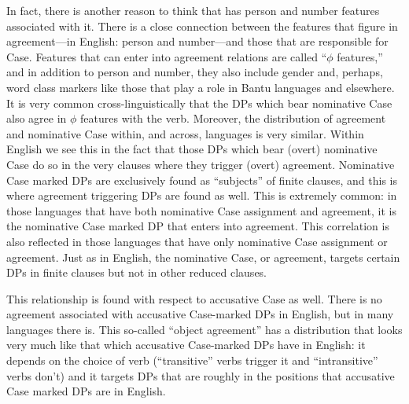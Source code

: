 In fact, there is another reason to think that  has person and number features associated with it. There is a close connection between the features that figure in agreement---in English: person and number---and those that are responsible for Case. Features that can enter into agreement relations are called ``$\phi$ features,'' and in addition to person and number, they also include gender and, perhaps, word class markers like those that play a role in Bantu languages and elsewhere. It is very common cross-linguistically that the DPs which bear nominative Case also agree in $\phi$ features with the verb. Moreover, the distribution of agreement and nominative Case within, and across, languages is very similar. Within English we see this in the fact that those DPs which bear (overt) nominative Case do so in the very clauses where they trigger (overt) agreement. Nominative Case marked DPs are exclusively found as ``subjects'' of finite clauses, and this is where agreement triggering DPs are found as well. This is extremely common: in those languages that have both nominative Case assignment and agreement, it is the nominative Case marked DP that enters into agreement. This correlation is also reflected in those languages that have only nominative Case assignment or agreement. Just as in English, the nominative Case, or agreement, targets certain DPs in finite clauses but not in other reduced clauses.

This relationship is found with respect to accusative Case as well. There is no agreement associated with accusative Case-marked DPs in English, but in many languages there is. This so-called ``object agreement'' has a distribution that looks very much like that which accusative Case-marked DPs have in English: it depends on the choice of verb (``transitive'' verbs trigger it and ``intransitive'' verbs don't) and it targets DPs that are roughly in the positions that accusative Case marked DPs are in English.

